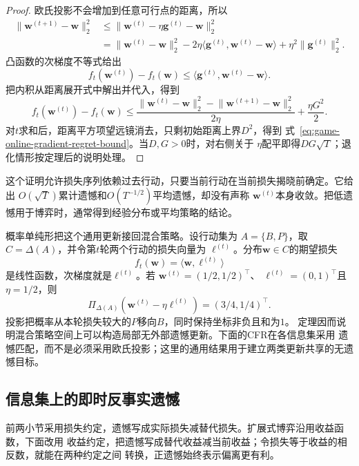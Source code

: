 \begin{proof}
欧氏投影不会增加到任意可行点的距离，所以
\begin{align*}
  \lVert\bm{w}^{(t+1)}-\bm{w}\rVert_2^2
  &\leq
  \lVert
    \bm{w}^{(t)}-\eta\bm{g}^{(t)}-\bm{w}
  \rVert_2^2\\
  &=
  \lVert\bm{w}^{(t)}-\bm{w}\rVert_2^2
  -2\eta
  \langle
    \bm{g}^{(t)},\bm{w}^{(t)}-\bm{w}
  \rangle
  +\eta^2\lVert\bm{g}^{(t)}\rVert_2^2.
\end{align*}
凸函数的次梯度不等式给出
\[
  f_t(\bm{w}^{(t)})-f_t(\bm{w})
  \leq
  \langle
    \bm{g}^{(t)},\bm{w}^{(t)}-\bm{w}
  \rangle.
\]
把内积从距离展开式中解出并代入，得到
\[
  f_t(\bm{w}^{(t)})-f_t(\bm{w})
  \leq
  \frac{
    \lVert\bm{w}^{(t)}-\bm{w}\rVert_2^2
    -
    \lVert\bm{w}^{(t+1)}-\bm{w}\rVert_2^2
  }{2\eta}
  +\frac{\eta G^2}{2}.
\]
对\(t\)求和后，距离平方项望远镜消去，只剩初始距离上界\(D^2\)，得到
式~\eqref{eq:game-online-gradient-regret-bound}。当\(D,G>0\)时，对右侧关于
\(\eta\)配平即得\(DG\sqrt{T}\)；退化情形按定理后的说明处理。
\end{proof}

这个证明允许损失序列依赖过去行动，只要当前行动在当前损失揭晓前确定。它给出
\(O(\sqrt{T})\)累计遗憾和\(O(T^{-1/2})\)平均遗憾，却没有声称
\(\bm{w}^{(t)}\)本身收敛。把低遗憾用于博弈时，通常得到经验分布或平均策略的结论。

概率单纯形把这个通用更新接回混合策略。设行动集为
\(A=\{B,P\}\)，取\(C=\Delta(A)\)，并令第\(t\)轮两个行动的损失向量为
\(\bm{\ell}^{(t)}\)。分布\(\bm{w}\in C\)的期望损失
\[
  f_t(\bm{w})
  =
  \langle\bm{w},\bm{\ell}^{(t)}\rangle
\]
是线性函数，次梯度就是\(\bm{\ell}^{(t)}\)。若
\(\bm{w}^{(t)}=(1/2,1/2)^{\top}\)、
\(\bm{\ell}^{(t)}=(0,1)^{\top}\)且\(\eta=1/2\)，则
\[
  \Pi_{\Delta(A)}
  \left(
    \bm{w}^{(t)}-\eta\bm{\ell}^{(t)}
  \right)
  =
  (3/4,1/4)^{\top}.
\]
投影把概率从本轮损失较大的\(P\)移向\(B\)，同时保持坐标非负且和为\(1\)。
定理因而说明混合策略空间上可以构造局部无外部遗憾更新。下面的CFR在各信息集采用
遗憾匹配，而不是必须采用欧氏投影；这里的通用结果用于建立两类更新共享的无遗憾目标。

\subsection{信息集上的即时反事实遗憾}

前两小节采用损失约定，遗憾写成实际损失减替代损失。扩展式博弈沿用收益函数，下面改用
收益约定，把遗憾写成替代收益减当前收益；令损失等于收益的相反数，就能在两种约定之间
转换，正遗憾始终表示偏离更有利。

